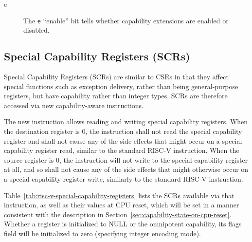 
\begin{description}
\item [e] The \texttt{e} ``enable'' bit  tells whether capability extensions are enabled or disabled.
\end{description}

\subsection{Special Capability Registers (SCRs)}
\label{subsection:cheri-riscv-scrs}

Special Capability Registers (SCRs) are similar to CSRs in that they affect
special functions such as exception delivery, rather than being
general-purpose registers, but have capability rather than integer types.
SCRs are therefore accessed via new capability-aware instructions.

The new  instruction allows reading and writing special
capability registers. When the destination register is 0, the instruction shall
not read the special capability register and shall not cause any of the
side-effects that might occur on a special capability register read, similar to
the standard  RISC-V instruction. When the source register is 0, the
instruction will not write to the special capability register at all, and so
shall not cause any of the side effects that might otherwise occur on a special
capability register write, similarly to the standard  RISC-V
instruction.

Table~\ref{tab:risc-v-special-capability-registers} lists the SCRs
available via that instruction, as well as their values at CPU reset, which
will be set in a manner consistent with the description in
Section~\ref{sec:capability-state-on-cpu-reset}.
Whether a register is initialized to NULL or the omnipotent capability, its
flags field will be initialized to zero (specifying integer encoding mode).


